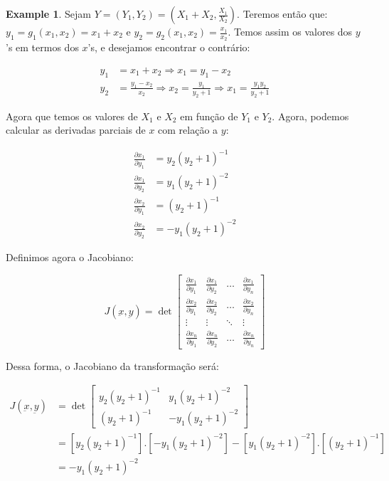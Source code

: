 \documentclass[
]{article}
\theoremstyle{definition}
\theoremstyle{definition}
\newtheorem{example}{Example}[section]
\theoremstyle{definition}
\theoremstyle{definition}
\theoremstyle{remark}
\begin{document}
\begin{example}
Sejam \(Y = (Y_{1},Y_{2}) = \left(X_{1} + X_{2}, \frac{X_{1}}{X_{2}}\right)\). Teremos então que: \(y_{1} = g_{1}(x_{1},x_{2}) = x_{1} + x_{2}\) e \(y_{2} = g_{2}(x_{1},x_{2}) = \frac{x_{1}}{x_{2}}\). Temos assim os valores dos \(y\)'s em termos dos \(x\)'s, e desejamos encontrar o contrário:

\begin{align*}
y_{1} &= x_{1} + x_{2} \Rightarrow x_{1} = y_{1} - x_{2} \\
y_{2} &= \frac{y_{1}-x_{2}}{x_{2}} \Rightarrow x_{2} = \frac{y_{1}}{y_{2}+1} \Rightarrow x_{1} = \frac{y_{1}y_{2}}{y_{2} + 1}
\end{align*}

Agora que temos os valores de \(X_{1}\) e \(X_{2}\) em função de \(Y_{1}\) e \(Y_{2}\). Agora, podemos calcular as derivadas parciais de \(x\) com relação a \(y\):

\begin{align*}
\frac{\partial x_{1}}{\partial y_{1}} &= y_{2}(y_{2} + 1)^{-1} \\
\frac{\partial x_{1}}{\partial y_{2}} &= y_{1}(y_{2} + 1)^{-2} \\
\frac{\partial x_{2}}{\partial y_{1}} &= (y_{2} + 1)^{-1} \\
\frac{\partial x_{2}}{\partial y_{2}} &= -y_{1}(y_{2} + 1)^{-2}
\end{align*}

Definimos agora o Jacobiano:

\begin{equation}
J(\underbar{x},\underbar{y}) = \det \begin{bmatrix}
\frac{\partial x_{1}}{\partial y_{1}} & \frac{\partial x_{1}}{\partial y_{2}} & \hdots & \frac{\partial x_{1}}{\partial y_{n}} \\
\frac{\partial x_{2}}{\partial y_{1}} & \frac{\partial x_{2}}{\partial y_{2}} & \hdots & \frac{\partial x_{2}}{\partial y_{n}} \\
\vdots & \vdots  & \ddots & \vdots \\
\frac{\partial x_{n}}{\partial y_{1}} & \frac{\partial x_{n}}{\partial y_{2}} & \hdots & \frac{\partial x_{n}}{\partial y_{n}}
\end{bmatrix}
\label{eq:jacobiano}
\end{equation}

Dessa forma, o Jacobiano da transformação será:

\begin{align*}
J(\underbar{x},\underbar{y}) &= \det \begin{bmatrix}
y_{2}(y_{2} + 1)^{-1} & y_{1}(y_{2} + 1)^{-2} \\
(y_{2} + 1)^{-1} & -y_{1}(y_{2} + 1)^{-2}
\end{bmatrix} \\
&= [y_{2}(y_{2} +1)^{-1}].[-y_{1}(y_{2}+1)^{-2}] - [y_{1}(y_{2} + 1)^{-2}].[(y_{2} + 1)^{-1}] \\
&= -y_{1}(y_{2} + 1)^{-2}
\end{align*}


\end{example}
\end{document}

